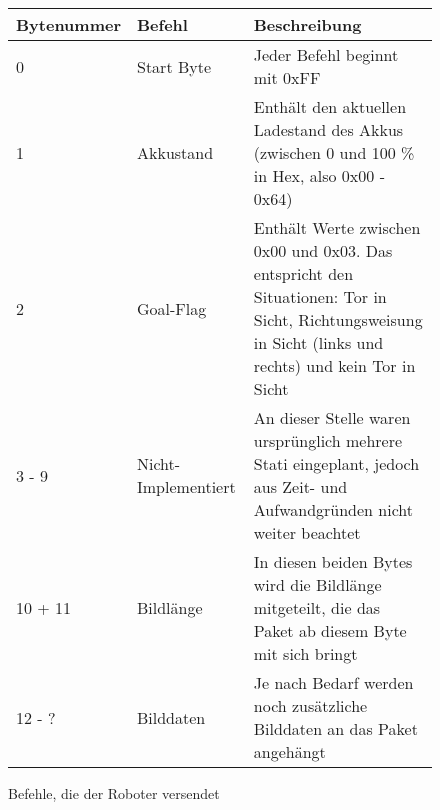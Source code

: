 \begin{figure}[!h]
	\begin{tabular}{||p{}||p{}||p{}||}
		\hline Bytenummer & Befehl & Beschreibung \\ 
		\hline 0 & Start Byte &  Jeder Befehl beginnt mit 0xFF\\ 
		\hline 1 & Akkustand & Enthält den aktuellen Ladestand des Akkus (zwischen 0 und 100 \% in Hex, also 0x00 - 0x64) \\ 
		\hline 2 & Goal-Flag & Enthält Werte zwischen 0x00 und 0x03. Das entspricht den Situationen: Tor in Sicht, Richtungsweisung in Sicht (links und rechts) und kein Tor in Sicht \\ 
		\hline 3 - 9 & Nicht-Implementiert & An dieser Stelle waren ursprünglich mehrere Stati eingeplant, jedoch aus Zeit- und Aufwandgründen nicht weiter beachtet \\ 
		\hline 10 + 11 & Bildlänge & In diesen beiden Bytes wird die Bildlänge mitgeteilt, die das Paket ab diesem Byte mit sich bringt \\ 
		\hline 12 - ? & Bilddaten & Je nach Bedarf werden noch zusätzliche Bilddaten an das Paket angehängt \\
		\hline
	\end{tabular}  
	\caption{Befehle, die der Roboter versendet}
	\label{tab:robot_to_serv}
\end{figure}                         

